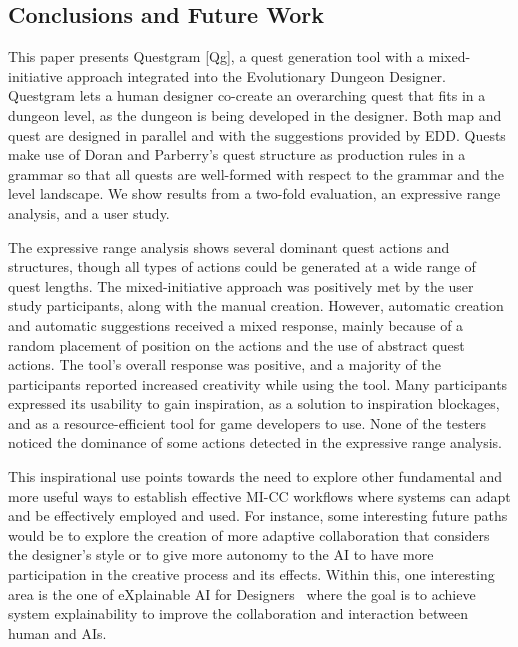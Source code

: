 \subsection{Conclusions and Future Work}

This paper presents Questgram [Qg], a quest generation tool with a mixed-initiative approach integrated into the Evolutionary Dungeon Designer. Questgram lets a human designer co-create an overarching quest that fits in a dungeon level, as the dungeon is being developed in the designer. Both map and quest are designed in parallel and with the suggestions provided by EDD. Quests make use of Doran and Parberry's quest structure as production rules in a grammar so that all quests are well-formed with respect to the grammar and the level landscape. We show results from a two-fold evaluation, an expressive range analysis, and a user study. 

The expressive range analysis shows several dominant quest actions and structures, though all types of actions could be generated at a wide range of quest lengths. The mixed-initiative approach was positively met by the user study participants, along with the manual creation. However, automatic creation and automatic suggestions received a mixed response, mainly because of a random placement of position on the actions and the use of abstract quest actions. The tool's overall response was positive, and a majority of the participants reported increased creativity while using the tool. Many participants expressed its usability to gain inspiration, as a solution to inspiration blockages, and as a resource-efficient tool for game developers to use. None of the testers noticed the dominance of some actions detected in the expressive range analysis.

This inspirational use points towards the need to explore other fundamental and more useful ways to establish effective MI-CC workflows where systems can adapt and be effectively employed and used. For instance, some interesting future paths would be to explore the creation of more adaptive collaboration that considers the designer's style or to give more autonomy to the AI to have more participation in the creative process and its effects. Within this, one interesting area is the one of eXplainable AI for Designers~ where the goal is to achieve system explainability to improve the collaboration and interaction between human and AIs.



